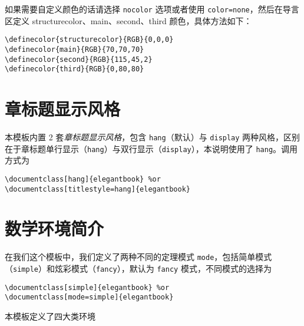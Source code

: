 \documentclass[cn,11pt]{elegantbook}
\begin{document}
如果需要自定义颜色的话请选择 \lstinline{nocolor} 选项或者使用 \lstinline{color=none}，然后在导言区定义 structurecolor、main、second、third 颜色，具体方法如下：
\begin{lstlisting}
\definecolor{structurecolor}{RGB}{0,0,0}
\definecolor{main}{RGB}{70,70,70}    
\definecolor{second}{RGB}{115,45,2}    
\definecolor{third}{RGB}{0,80,80}   
\end{lstlisting}


\section{章标题显示风格}

本模板内置 2 套\textit{章标题显示风格}，包含 \lstinline{hang}（默认）与 \lstinline{display} 两种风格，区别在于章标题单行显示（\lstinline{hang}）与双行显示（\lstinline{display}），本说明使用了 \lstinline{hang}。调用方式为
\begin{lstlisting}
\documentclass[hang]{elegantbook} %or
\documentclass[titlestyle=hang]{elegantbook}
\end{lstlisting}

\section{数学环境简介}

在我们这个模板中，我们定义了两种不同的定理模式 \lstinline{mode}，包括简单模式（\lstinline{simple}）和炫彩模式（\lstinline{fancy}），默认为 \lstinline{fancy} 模式，不同模式的选择为
\begin{lstlisting}
\documentclass[simple]{elegantbook} %or
\documentclass[mode=simple]{elegantbook}
\end{lstlisting}

本模板定义了四大类环境
\end{document}
